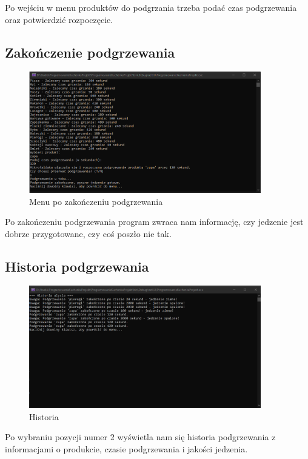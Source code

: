Po wejściu w menu produktów do podgrzania trzeba podać czas podgrzewania oraz potwierdzić rozpoczęcie. 

\subsection{Zakończenie podgrzewania}
\begin{figure}[h]
    \centering
    \includegraphics[width=0.9\textwidth]{Menu2.png}
      \caption{Menu po zakończeniu podgrzewania}
    \label{fig:example}
\end{figure}

Po zakończeniu podgrzewania program zwraca nam informację, czy jedzenie jest dobrze przygotowane, czy coś poszło nie tak.

\newpage

\subsection{Historia podgrzewania}
\begin{figure}[h]
    \centering
    \includegraphics[width=0.9\textwidth]{Menu3.png}
      \caption{Historia}
    \label{fig:example}
\end{figure}

Po wybraniu pozycji numer 2 wyświetla nam się historia podgrzewania z informacjami o produkcie, czasie podgrzewania i jakości jedzenia. 

